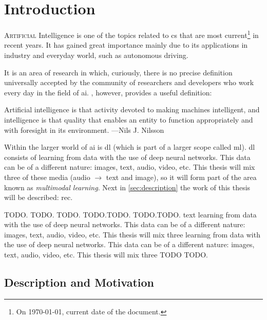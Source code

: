 

\chapter{Introduction} \label{cha:intro}


\lettrine{A}{rtificial} Intelligence is one of the topics related to \gls{cs}
that are most current\footnote{On \today, current date of the document.} in
recent years. It has gained great importance mainly due to its applications in
industry and everyday world, such as autonomous driving.

It is an area of research in which, curiously, there is no precise definition
universally accepted by the community of researchers and developers who work
every day in the field of \gls{ai}. ,
however, provides a useful definition:

\begin{quoteBox}
  Artificial intelligence is that activity devoted to making machines
  intelligent, and intelligence is that quality that enables an entity to
  function appropriately and with foresight in its environment.
  \tcblower
  ---Nils J. Nilsson
\end{quoteBox}

Within the larger world of \gls{ai} is \gls{dl} (which is part of a larger
scope called \gls{ml}). \gls{dl} consists of learning from data with the use of
deep neural networks. This data can be of a different nature: images, text,
audio, video, etc. This thesis will mix three of these media (audio
\(\rightarrow\) text and image), so it will form part of the area known as
\emph{multimodal learning}. Next in \vref{sec:description} the work of this
thesis will be described: \gls{rec}.

TODO. TODO. TODO. TODO.TODO. TODO.TODO. text learning from data with the use of
deep neural networks. This data can be of a different nature: images, text,
audio, video, etc. This thesis will mix three learning from data with the use
of deep neural networks. This data can be of a different nature: images, text,
audio, video, etc. This thesis will mix three TODO TODO.


\section{Description and Motivation} \label{sec:description}

